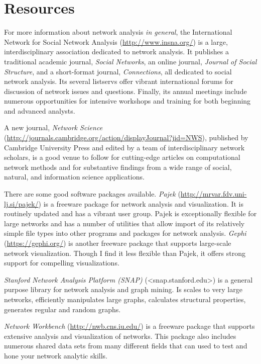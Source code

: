 \documentclass[]{krantz}
\begin{document}
\section{Resources}\label{resources-4}

For more information about network analysis \emph{in general}, the
International Network for Social Network Analysis
(\url{http://www.insna.org/}) is a large, interdisciplinary association
dedicated to network analysis. It publishes a traditional academic
journal, \emph{Social Networks}, an online journal, \emph{Journal of
Social Structure}, and a short-format journal, \emph{Connections}, all
dedicated to social network analysis. Its several listservs offer
vibrant international forums for discussion of network issues and
questions. Finally, its annual meetings include numerous opportunities
for intensive workshops and training for both beginning and advanced
analysts.

A new journal, \emph{Network Science}
(\url{http://journals.cambridge.org/action/displayJournal?jid=NWS}),
published by Cambridge University Press and edited by a team of
interdisciplinary network scholars, is a good venue to follow for
cutting-edge articles on computational network methods and for
substantive findings from a wide range of social, natural, and
information science applications.

There are some good software packages available. \emph{Pajek}
(\url{http://mrvar.fdv.uni-lj.si/pajek/}) is a freeware package for
network analysis and visualization. It is routinely updated and has a
vibrant user group. Pajek is exceptionally flexible for large networks
and has a number of utilities that allow import of its relatively simple
file types into other programs and packages for network analysis.
\emph{Gephi} (\url{https://gephi.org/}) is another freeware package that
supports large-scale network visualization. Though I find it less
flexible than Pajek, it offers strong support for compelling
visualizations.

\emph{Stanford Network Analysis Platform (SNAP)}
(\textless{}snap.stanford.edu\textgreater{}) is a general purpose
library for network analysis and graph mining. Is scales to very large
networks, efficiently manipulates large graphs, calculates structural
properties, generates regular and random graphs.

\emph{Network Workbench} (\url{http://nwb.cns.iu.edu/}) is a freeware
package that supports extensive analysis and visualization of networks.
This package also includes numerous shared data sets from many different
fields that can used to test and hone your network analytic skills.
\end{document}
